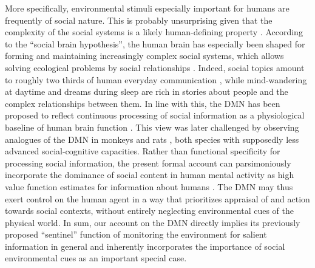 \documentclass[10pt,letterpaper]{article}
\begin{document}
More specifically,
environmental stimuli especially important for humans are frequently of
social nature. This is probably unsurprising
given that
the complexity of the social systems
is a likely human-defining property
\citep{tomasello2009cultural}.
According to the ``social brain hypothesis'',
the human brain has especially been shaped for
forming and maintaining increasingly complex
social systems,
which allows solving ecological problems by social relationships
\citep{whiten1988machiavellian}.
Indeed, social topics amount to roughly
two thirds of human everyday communication \citep{dunbar1997human},
while
mind-wandering at daytime and dreams during sleep
are rich in stories about people and
the complex relationships between them.
%
In line with this, the DMN has been proposed to reflect
continuous processing of social information as a
physiological baseline of human brain function
\citep{schilbach2008minds}. This view was later challenged by observing
analogues of the DMN in monkeys \citep{mantini2011default}
and rats \citep{lu2012rat}, both species with
supposedly less advanced social-cognitive capacities.
Rather than functional specificity for processing social information,
the present formal account can parsimoniously incorporate
the dominance of social content in
human mental activity
as high value function estimates for information about humans
\citep{baker2009action, kampe2001psychology, krienen2010clan}.
The DMN may thus exert control on the human agent in a way that prioritizes
appraisal of and action towards social contexts,
without entirely neglecting environmental cues of the physical world.
In sum,
our account on the DMN directly implies
its previously proposed ``sentinel'' function
of monitoring the environment for salient information
in general and
inherently incorporates the importance of social environmental cues
as an important special case.
\end{document}
